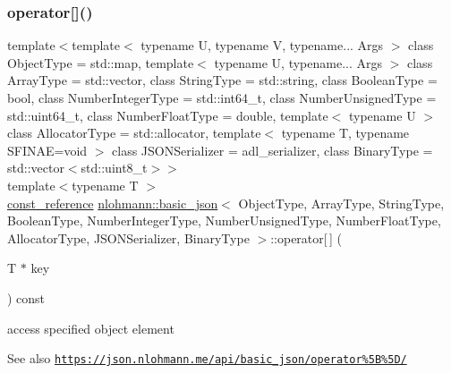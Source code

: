 \subsubsection{\texorpdfstring{operator[]()}{operator[]()}\hspace{0.1cm}{\footnotesize\ttfamily [6/8]}}
{\footnotesize\ttfamily template$<$template$<$ typename U, typename V, typename... Args $>$ class Object\+Type = std\+::map, template$<$ typename U, typename... Args $>$ class Array\+Type = std\+::vector, class String\+Type  = std\+::string, class Boolean\+Type  = bool, class Number\+Integer\+Type  = std\+::int64\+\_\+t, class Number\+Unsigned\+Type  = std\+::uint64\+\_\+t, class Number\+Float\+Type  = double, template$<$ typename U $>$ class Allocator\+Type = std\+::allocator, template$<$ typename T, typename S\+F\+I\+N\+A\+E=void $>$ class J\+S\+O\+N\+Serializer = adl\+\_\+serializer, class Binary\+Type  = std\+::vector$<$std\+::uint8\+\_\+t$>$$>$ \\
template$<$typename T $>$ \\
\hyperlink{classnlohmann_1_1basic__json_ab8a1c33ee7b154fc41ca2545aa9724e6}{const\+\_\+reference} \hyperlink{classnlohmann_1_1basic__json}{nlohmann\+::basic\+\_\+json}$<$ Object\+Type, Array\+Type, String\+Type, Boolean\+Type, Number\+Integer\+Type, Number\+Unsigned\+Type, Number\+Float\+Type, Allocator\+Type, J\+S\+O\+N\+Serializer, Binary\+Type $>$\+::operator\mbox{[}$\,$\mbox{]} (\begin{DoxyParamCaption}\item[{T $\ast$}]{key }\end{DoxyParamCaption}) const\hspace{0.3cm}{\ttfamily [inline]}}



access specified object element 

\begin{DoxySeeAlso}{See also}
\href{https://json.nlohmann.me/api/basic_json/operator%5B%5D/}{\tt https\+://json.\+nlohmann.\+me/api/basic\+\_\+json/operator\%5\+B\%5\+D/} 
\end{DoxySeeAlso}
\mbox{\label{classnlohmann_1_1basic__json_a0d3deaa73b3644b4da3f8ef3172cd8d2}} 
